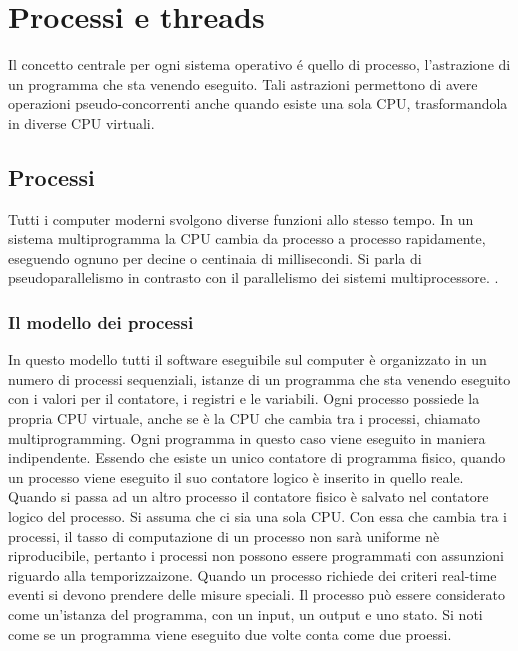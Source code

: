 \chapter{Processi e threads}
Il concetto centrale per ogni sistema operativo \'e quello di processo, l'astrazione di un programma che sta venendo eseguito. Tali astrazioni permettono 
di avere operazioni pseudo-concorrenti anche quando esiste una sola CPU, trasformandola in diverse CPU virtuali. 
\section{Processi}
Tutti i computer moderni svolgono diverse funzioni allo stesso tempo. In un sistema multiprogramma la CPU cambia da processo a processo rapidamente, 
eseguendo ognuno per decine o centinaia di millisecondi. Si parla di pseudoparallelismo in contrasto con il parallelismo dei sistemi multiprocessore. .
\subsection{Il modello dei processi}
In questo modello tutti il software eseguibile sul computer \`e organizzato in un numero di processi sequenziali, istanze di un programma che sta venendo eseguito con i valori per 
il contatore, i registri e le variabili. Ogni processo possiede la propria CPU virtuale, anche se \`e la CPU che cambia tra i processi, chiamato multiprogramming. Ogni programma in
questo caso viene eseguito in maniera indipendente. Essendo che esiste un unico contatore di programma fisico, quando un processo viene eseguito il suo contatore logico \`e inserito 
in quello reale. Quando si passa ad un altro processo il contatore fisico \`e salvato nel contatore logico del processo. Si assuma che ci sia una sola CPU. Con essa che cambia tra i 
processi, il tasso di computazione di un processo non sar\`a uniforme n\`e riproducibile, pertanto i processi non possono essere programmati con assunzioni riguardo alla temporizzaizone.
Quando un processo richiede dei criteri real-time eventi si devono prendere delle misure speciali. Il processo pu\`o essere considerato come un'istanza del programma, con un input, un
output e uno stato. Si noti come se un programma viene eseguito due volte conta come due proessi. 
